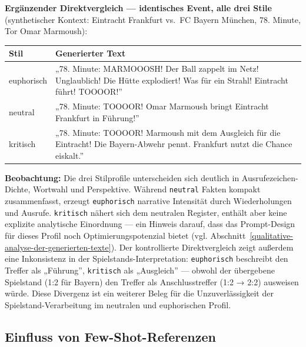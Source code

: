 \textbf{Ergänzender Direktvergleich --- identisches Event, alle drei
Stile} (synthetischer Kontext: Eintracht Frankfurt vs.~FC Bayern
München, 78. Minute, Tor Omar Marmoush):

{\def\LTcaptype{none} %
\begin{longtable}[]{@{}
  >{\raggedright\arraybackslash}p{}
  >{\raggedright\arraybackslash}p{}@{}}
\toprule\noalign{}
\begin{minipage}[b]{\linewidth}\raggedright
Stil
\end{minipage} & \begin{minipage}[b]{\linewidth}\raggedright
Generierter Text
\end{minipage} \\
\midrule\noalign{}
\endhead
\bottomrule\noalign{}
\endlastfoot
euphorisch & „78. Minute: MARMOOOSH! Der Ball zappelt im Netz!
Unglaublich! Die Hütte explodiert! Was für ein Strahl! Eintracht führt!
TOOOOR!'' \\
neutral & „78. Minute: TOOOOR! Omar Marmoush bringt Eintracht Frankfurt
in Führung!'' \\
kritisch & „78. Minute: TOOOOR! Marmoush mit dem Ausgleich für die
Eintracht! Die Bayern-Abwehr pennt. Frankfurt nutzt die Chance
eiskalt.'' \\
\end{longtable}
}

\textbf{Beobachtung:} Die drei Stilprofile unterscheiden sich deutlich
in Ausrufezeichen-Dichte, Wortwahl und Perspektive. Während
\texttt{neutral} Fakten kompakt zusammenfasst, erzeugt
\texttt{euphorisch} narrative Intensität durch Wiederholungen und
Ausrufe. \texttt{kritisch} nähert sich dem neutralen Register, enthält
aber keine explizite analytische Einordnung --- ein Hinweis darauf, dass
das Prompt-Design für dieses Profil noch Optimierungspotenzial bietet
(vgl. Abschnitt~\ref{qualitative-analyse-der-generierten-texte}). Der kontrollierte Direktvergleich zeigt außerdem
eine Inkonsistenz in der Spielstands-Interpretation: \texttt{euphorisch}
beschreibt den Treffer als „Führung'', \texttt{kritisch} als
„Ausgleich'' --- obwohl der übergebene Spielstand (1:2 für Bayern) den
Treffer als Anschlusstreffer (1:2 → 2:2) ausweisen würde. Diese
Divergenz ist ein weiterer Beleg für die Unzuverlässigkeit der
Spielstand-Verarbeitung im neutralen und euphorischen Profil.

\subsection{Einfluss von
Few-Shot-Referenzen}\label{einfluss-von-few-shot-referenzen}

